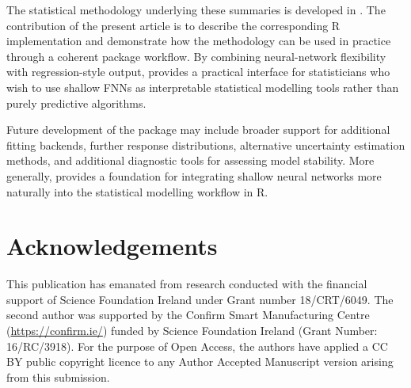 The statistical methodology underlying these summaries is developed in \citet{mcinerney2023feedforward}.
The contribution of the present article is to describe the corresponding R implementation and demonstrate how the methodology can be used in practice through a coherent package workflow.
By combining neural-network flexibility with regression-style output,  provides a practical interface for statisticians who wish to use shallow FNNs as interpretable statistical modelling tools rather than purely predictive algorithms.

Future development of the package may include broader support for additional fitting backends, further response distributions, alternative uncertainty estimation methods, and additional diagnostic tools for assessing model stability.
More generally,  provides a foundation for integrating shallow neural networks more naturally into the statistical modelling workflow in R.

\section{Acknowledgements}\label{acknowledgements}

This publication has emanated from research conducted with the financial support of Science Foundation Ireland under Grant number 18/CRT/6049.
The second author was supported by the Confirm Smart Manufacturing Centre (\url{https://confirm.ie/}) funded by Science Foundation Ireland (Grant Number: 16/RC/3918).
For the purpose of Open Access, the authors have applied a CC BY public copyright licence to any Author Accepted Manuscript version arising from this submission.



\address{%
Andrew McInerney\\
University of Limerick\\%
Department of Mathematics and Statistics\\ Limerick, Ireland\\
%
%
\textit{ORCiD: \href{https://orcid.org/0000-0002-2348-2159}{0000-0002-2348-2159}}\\%
\href{mailto:andrew.mcinerney@ul.ie}{\nolinkurl{andrew.mcinerney@ul.ie}}%
}

\address{%
Kevin Burke\\
University of Limerick\\%
Department of Mathematics and Statistics\\ Limerick, Ireland\\
%
%
%
\href{mailto:kevin.burke@ul.ie}{\nolinkurl{kevin.burke@ul.ie}}%
}
